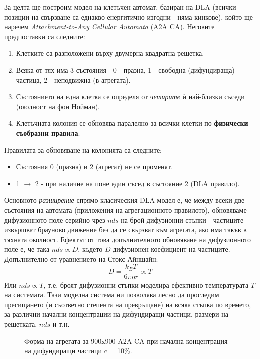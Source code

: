 За целта ще построим модел на клетъчен автомат, базиран на DLA (всички позиции на свързване са еднакво енергитично изгодни - няма кинкове), който ще наречем \textit{Attachment-to-Any Cellular Automata} (A2A CA). Неговите предпоставки са следните:
\begin{enumerate}
    \item Клетките са разположени върху двумерна квадратна решетка.
    \item Всяка от тях има 3 състояния - 0 - празна, 1 - свободна (дифундираща) частица, 2 - неподвижна (в агрегата).
    \item Състоянието на една клетка се определя от \textit{четирите} ѝ най-близки съседи (околност на фон Нойман).
    \item Клетъчната колония се обновява паралелно за всички клетки по \textbf{физически съобразни правила}.
\end{enumerate}
Правилата за обновяване на колонията са следните:
\begin{itemize}
    \item Състояния 0 (празна) и 2 (агрегат) не се променят.
    \item 1 $\rightarrow$ 2 - при наличие на поне един съсед в състояние 2 (DLA правило).
\end{itemize}
Основното \textit{разширение} спрямо класическия DLA модел е, че между всеки две състояния на автомата (приложения на агрегационното правилото), обновяваме дифузионното поле серийно чрез $nds$ на брой дифузионни стъпки - частиците извършват брауново движение без да се свързват към агрегата, ако има такъв в тяхната околност. 
Ефектът от това допълнителното обновяване на дифузионното поле е, че така $nds \propto D$, където $D$-дифузионен коефициент на частиците. Допълнително от уравнението на Стокс-Айнщайн:
\begin{equation*}
    D = \frac{k_{B} T}{6 \pi \eta r} \propto T
\end{equation*}
Или $nds \propto T$, т.е. броят дифузионни стъпки моделира ефективно температурата $T$ на системата. Тази моделна система ни позволява лесно да проследим пресищането (и съответно степента на превръщане) на всяка стъпка по времето, за различни начални концентрации на дифундиращи частици, размери на решетката, $nds$ и т.н.
\begin{figure}[hbpt]
    \centering
    \caption{Форма на агрегата за 900x900 A2A CA при начална концентрация на дифундиращи частици c = 10\%.}
    \label{fig:nds_effect}
\end{figure}

